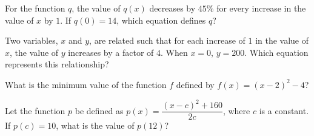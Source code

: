 For the function $q$, the value of $q(x)$ decreases by $45\%$ for every increase in the value of $x$ by $1$.  
If $q(0) = 14$, which equation defines $q$?

\vspace{0.75em}


\newpage
\noindent\markforreview
\vspace{1em}

Two variables, $x$ and $y$, are related such that for each increase of $1$ in the value of $x$, the value of $y$ increases by a factor of $4$.  
When $x = 0$, $y = 200$. Which equation represents this relationship?

\vspace{0.75em}


\vspace{2em}

\noindent\markforreview
\vspace{1em}

What is the minimum value of the function $f$ defined by $f(x) = (x - 2)^2 - 4$?

\vspace{0.75em}


\newpage

\noindent\markforreview
\vspace{1em}

Let the function $p$ be defined as $p(x) = \dfrac{(x - c)^2 + 160}{2c}$, where $c$ is a constant.  
If $p(c) = 10$, what is the value of $p(12)$?

\vspace{0.75em}
































